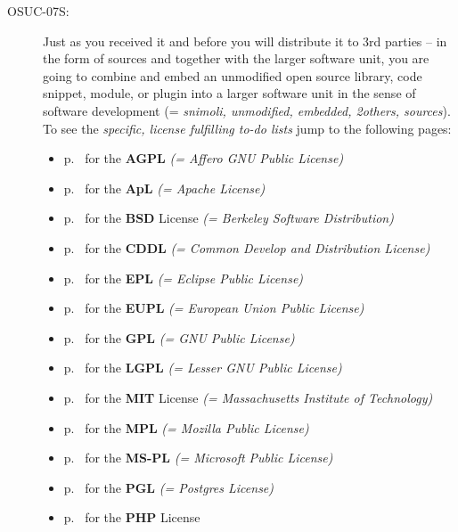\begin{description}
\item[OSUC-07S:]\label{OSUC-07S-DEF} Just as you received it and before you will
distribute it to 3rd parties -- in the form of sources and together with the
larger software unit, you are going to combine and embed an unmodified open
source library, code snippet, module, or plugin into a larger software unit in
the sense of software development (= \textit{snimoli, unmodified, embedded,
2others, sources}). To see the \textit{specific, license fulfilling to-do lists}
jump to the following pages:
   \begin{itemize}
    \item p.\ \pageref{OSUC-07S-AGPL} for the \textbf{AGPL}
      \textit{(= Affero GNU Public License)} 
    \item p.\ \pageref{OSUC-07S-Apache20} for the \textbf{ApL}
      \textit{(= Apache License)}
    \item p.\ \pageref{OSUC-07S-BSD} for the \textbf{BSD} License
      \textit{(= Berkeley Software Distribution)}
    \item p.\ \pageref{OSUC-07S-CDDL} for the \textbf{CDDL}
      \textit{(= Common Develop and Distribution License)}  
    \item p.\ \pageref{OSUC-07S-EPL} for the \textbf{EPL}
      \textit{(= Eclipse Public License)}     
    \item p.\ \pageref{OSUC-07S-EUPL} for the \textbf{EUPL}
      \textit{(= European Union Public License)} 
    \item p.\ \pageref{OSUC-07S-GPL} for the \textbf{GPL}
       \textit{(= GNU Public License)} 
    \item p.\ \pageref{OSUC-07S-LGPL} for the \textbf{LGPL}
      \textit{(= Lesser GNU Public License)}           
    \item p.\ \pageref{OSUC-07S-MIT} for the \textbf{MIT} License
       \textit{(= Massachusetts Institute of Technology)} 
    \item p.\ \pageref{OSUC-07S-MPL} for the \textbf{MPL}
      \textit{(= Mozilla Public License)}     
    \item p.\ \pageref{OSUC-07S-MS-PL} for the \textbf{MS-PL}
      \textit{(= Microsoft Public License)} 
    \item p.\ \pageref{OSUC-07S-PGL} for the \textbf{PGL}
      \textit{(= Postgres License)} 
    \item p.\ \pageref{OSUC-07S-PHP} for the \textbf{PHP} License 
  \end{itemize}


\end{description}
